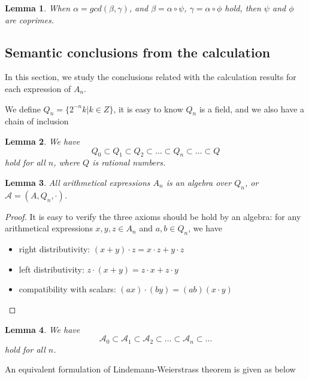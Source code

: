 \documentclass{article}
\newtheorem{lemma}{Lemma}
\begin{document}
\begin{lemma}
\label{lemma:coprimes}
When $\alpha = gcd(\beta, \gamma)$, and $\beta = \alpha \circ \psi$, $\gamma = \alpha \circ \phi$ hold, then $\psi$ and $\phi$ are coprimes.
\end{lemma}

\subsection{Semantic conclusions from the calculation}\label{sec:calculation}

In this section, we study the conclusions related with the calculation results for each expression of $A_n$.

We define $Q_n = \{2^{-n}k | k \in Z\}$, it is easy to know $Q_n$ is a field, and we also have a chain of inclusion

\begin{lemma}
\label{lemma:chainofinclusion2}
We have
$$ Q_0 \subset Q_1 \subset Q_2 \subset \ldots \subset Q_n \subset \ldots \subset Q$$
hold for all $n$, where $Q$ is rational numbers.
\end{lemma}

\begin{lemma}
\label{lemma:arithmeticalalgebra}
All arithmetical expressions $A_n$ is an algebra over $Q_n$, or $\mathcal{A} = (A, Q_n, \cdot)$.
\end{lemma}

\begin{proof}
It is easy to verify the three axioms should be hold by an algebra:
for any arithmetical expressions $x, y, z \in A_n$ and $a, b \in Q_n$, we have
\begin{itemize}
    \item right distributivity: $(x + y) \cdot z = x \cdot z + y \cdot z$
    \item left distributivity: $z \cdot (x + y) = z \cdot x + z \cdot y$
    \item compatibility with scalars: $(ax) \cdot (by) = (ab) (x \cdot y)$
\end{itemize}
\qedhere
\end{proof}

\begin{lemma}
\label{lemma:chainofinclusion3}
We have
$$ \mathcal{A}_0 \subset \mathcal{A}_1 \subset \mathcal{A}_2 \subset \ldots \subset \mathcal{A}_n \subset \ldots $$
hold for all $n$.
\end{lemma}

An equivalent formulation of Lindemann-Weierstrass theorem is given as below
\end{document}
